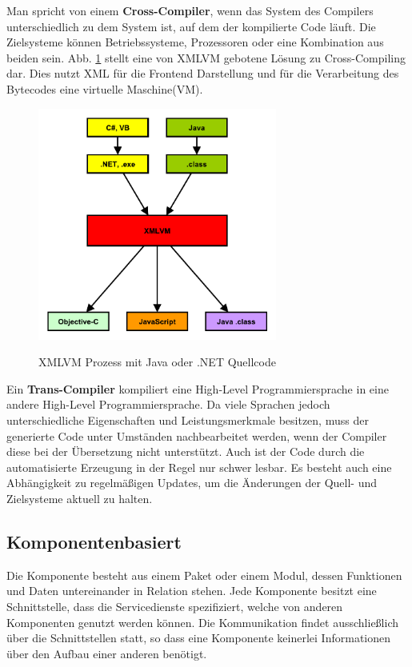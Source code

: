 \medskip
Man spricht von einem \textbf{Cross-Compiler}, wenn das System des Compilers unterschiedlich zu dem System ist, auf dem der kompilierte Code läuft. Die Zielsysteme können Betriebssysteme, Prozessoren oder eine Kombination aus beiden sein. Abb. \ref{graph_compilation_XMLVM} stellt eine von XMLVM gebotene Lösung zu Cross-Compiling dar. Dies nutzt XML für die Frontend Darstellung und für die Verarbeitung des Bytecodes eine virtuelle Maschine(VM).

\begin{figure}[htbp]
	\centering
	\includegraphics[width=0.7\textwidth]{Bilder/Compilation_Cross_XMLVM}
	\caption{XMLVM Prozess mit Java oder .NET Quellcode}\label{graph_compilation_XMLVM}\citep{XMLVM_Toolchain}
\end{figure}

\medskip
Ein \textbf{Trans-Compiler} kompiliert eine High-Level Programmiersprache in eine andere High-Level Programmiersprache. Da viele Sprachen jedoch unterschiedliche Eigenschaften und Leistungsmerkmale besitzen, muss der generierte Code unter Umständen nachbearbeitet werden, wenn der Compiler diese bei der Übersetzung nicht unterstützt. Auch ist der Code durch die automatisierte Erzeugung in der Regel nur schwer lesbar. Es besteht auch eine Abhängigkeit zu regelmäßigen Updates, um die Änderungen der Quell- und Zielsysteme aktuell zu halten.

\subsection{Komponentenbasiert}
Die Komponente besteht aus einem Paket oder einem Modul, dessen Funktionen und Daten untereinander in Relation stehen. Jede Komponente besitzt eine Schnittstelle, dass die Servicedienste spezifiziert, welche von anderen Komponenten genutzt werden können. Die Kommunikation findet ausschließlich über die Schnittstellen statt, so dass eine Komponente keinerlei Informationen über den Aufbau einer anderen benötigt. 

